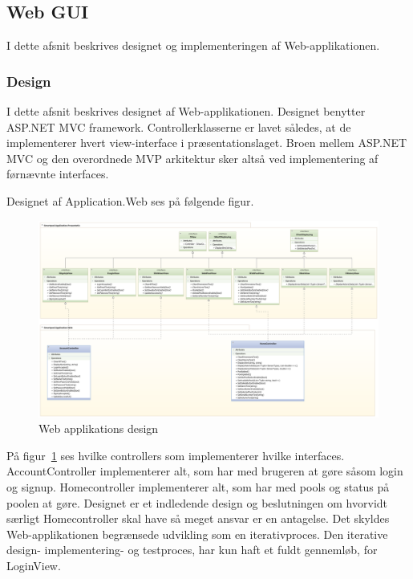 \subsection{Web GUI}
I dette afsnit beskrives designet og implementeringen af Web-applikationen.

\subsubsection{Design}
I dette afsnit beskrives designet af Web-applikationen. Designet benytter ASP.NET MVC framework. Controllerklasserne er lavet således, at de implementerer hvert view-interface i præsentationslaget. Broen mellem ASP.NET MVC og den overordnede MVP arkitektur sker altså ved implementering af førnævnte interfaces.

Designet af Application.Web ses på følgende figur.

\begin{landscape}
\begin{figure}
	\centering
	\includegraphics[width=1\linewidth]{figs/design/application_web}
	\caption{Web applikations design}
	\label{fig:web_class}
\end{figure}
\end{landscape}
På figur~\ref{fig:web_class} ses hvilke controllers som implementerer hvilke interfaces. AccountController implementerer alt, som har med brugeren at gøre såsom login og signup. Homecontroller implementerer alt, som har med pools og status på poolen at gøre. Designet er et indledende design og beslutningen om hvorvidt særligt Homecontroller skal have så meget ansvar er en antagelse. Det skyldes Web-applikationen begrænsede udvikling som en iterativproces. Den iterative design- implementering- og testproces, har kun haft et fuldt gennemløb, for LoginView. 

